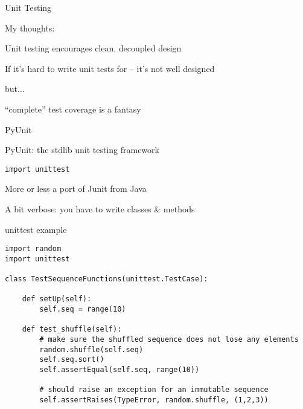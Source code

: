 \documentclass{beamer}
\begin{document}
\begin{frame}[fragile]{Unit Testing}

{\LARGE My thoughts:}

\vfill
{\Large Unit testing encourages clean, decoupled design}

\vfill
{\Large If it's hard to write unit tests for -- it's not well designed}

\vfill
{\Large but...}

\vfill
{\Large ``complete'' test coverage is a fantasy}

\end{frame} 


\begin{frame}[fragile]{PyUnit}

{\LARGE PyUnit: the stdlib unit testing framework}

\vfill
{\Large \verb|import unittest|}

\vfill
{\Large More or less a port of Junit from Java}

\vfill
{\Large A bit verbose: you have to write classes \& methods}

\end{frame} 

\begin{frame}[fragile]{unittest example}

{\small
\begin{verbatim}
import random
import unittest

class TestSequenceFunctions(unittest.TestCase):

    def setUp(self):
        self.seq = range(10)

    def test_shuffle(self):
        # make sure the shuffled sequence does not lose any elements
        random.shuffle(self.seq)
        self.seq.sort()
        self.assertEqual(self.seq, range(10))

        # should raise an exception for an immutable sequence
        self.assertRaises(TypeError, random.shuffle, (1,2,3))
\end{verbatim}
}

\end{frame} 
\end{document}
